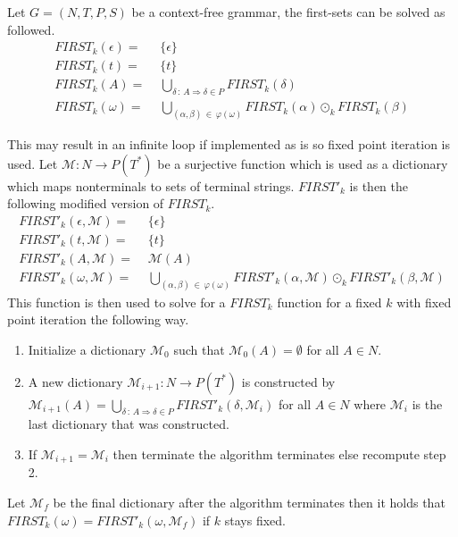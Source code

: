 \begin{algorithm}
    Let $G = (N, T, P, S)$ be a context-free grammar, the first-sets can be solved as followed.
    \begin{align*}
        FIRST_k(\epsilon) =&\,\, \{\epsilon\} \\
        FIRST_k(t) =&\,\, \{t\} \\
        FIRST_k(A) =&\,\, \bigcup_{\delta \, : \, A \Rightarrow \delta \in P} FIRST_k(\delta) \\
        FIRST_k(\omega) =&\,\, \bigcup_{(\alpha, \beta) \, \in \, \varphi(\omega)} FIRST_k(\alpha) \odot_k FIRST_k(\beta)
    \end{align*}
\end{algorithm}
\noindent This may result in an infinite loop if implemented as is so fixed point iteration is used. Let $\mathcal{M}: N \to P(T^*)$ be a surjective function which is used as a dictionary which maps nonterminals to sets of terminal strings. $FIRST'_k$ is then the following modified version of $FIRST_k$.
\begin{align*}
    FIRST'_k(\epsilon, \mathcal{M}) =&\,\, \{\epsilon\} \\
    FIRST'_k(t, \mathcal{M}) =&\,\, \{t\} \\
    FIRST'_k(A, \mathcal{M}) =&\,\, \mathcal{M}(A) \\
    FIRST'_k(\omega, \mathcal{M}) =&\,\, \bigcup_{(\alpha, \beta) \, \in \, \varphi(\omega)} FIRST'_k(\alpha, \mathcal{M}) \odot_k FIRST'_k(\beta, \mathcal{M})
\end{align*}
This function is then used to solve for a $FIRST_k$ function for a fixed $k$ with fixed point iteration the following way.
\begin{enumerate}
    \item Initialize a dictionary $\mathcal{M}_0$ such that $\mathcal{M}_0(A) = \emptyset$ for all $A \in N$.
    \item A new dictionary $\mathcal{M}_{i+1}: N \to P(T^*)$ is constructed by $\mathcal{M}_{i+1}(A) = \bigcup_{\delta \, : \, A \Rightarrow \delta \in P} FIRST'_k(\delta, \mathcal{M}_{i})$ for all $A \in N$ where $\mathcal{M}_{i}$ is the last dictionary that was constructed.
    \item If $\mathcal{M}_{i + 1} = \mathcal{M}_{i}$ then terminate the algorithm terminates else recompute step 2.
\end{enumerate}
Let $\mathcal{M}_f$ be the final dictionary after the algorithm terminates then it holds that $FIRST_k(\omega) = FIRST'_k(\omega, \mathcal{M}_f)$ if $k$ stays fixed.
